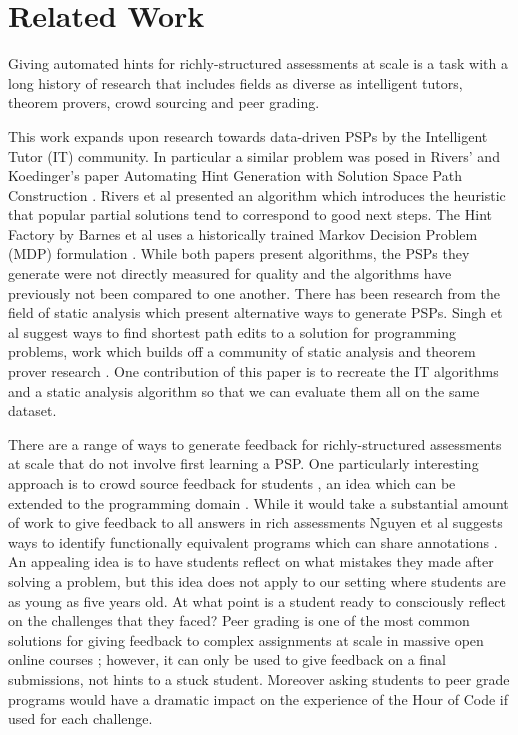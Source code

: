 \section{Related Work}

Giving automated hints for richly-structured assessments at scale is a task with a long history of research that includes fields as diverse as intelligent tutors, theorem provers, crowd sourcing and peer grading.

This work expands upon research towards data-driven PSPs by the Intelligent Tutor (IT) community. In particular a similar problem was posed in Rivers' and Koedinger's paper Automating Hint Generation with Solution Space Path Construction \cite{rivers2014automating}. Rivers et al presented an algorithm which introduces the heuristic that popular partial solutions tend to correspond to good next steps. The Hint Factory by Barnes et al uses a historically trained Markov Decision Problem (MDP) formulation \cite{barnes2008toward}. While both papers present algorithms, the PSPs they generate were not directly measured for quality and the algorithms have previously not been compared to one another. There has been research from the field of static analysis which present alternative ways to generate PSPs. Singh et al suggest ways to find shortest path edits to a solution for programming problems, work which builds off a community of static analysis and theorem prover research \cite{singh2013automated}  \cite{cheang2003automated}. One contribution of this paper is to recreate the IT algorithms and a static analysis algorithm so that we can evaluate them all on the same dataset. 

There are a range of ways to generate feedback for richly-structured assessments at scale that do not involve first learning a PSP. One particularly interesting approach is to crowd source feedback for students \cite{weld2012personalized}, an idea which can be extended to the programming domain \cite{watson2012bluefix}. While it would take a substantial amount of work to give feedback to all answers in rich assessments Nguyen et al suggests ways to identify functionally equivalent programs which can share annotations \cite{nguyen2014codewebs} \cite{rivers2012canonicalizing}. An appealing idea is to have students reflect on what mistakes they made after solving a problem, but this idea does not apply to our setting where students are as young as five years old. At what point is a student ready to consciously reflect on the challenges that they faced? Peer grading is one of the most common solutions for giving feedback to complex assignments at scale in massive open online courses \cite{kulkarni2013peer}; however, it can only be used to give feedback on a final submissions, not hints to a stuck student. Moreover asking students to peer grade programs would have a dramatic impact on the experience of the Hour of Code if used for each challenge.

